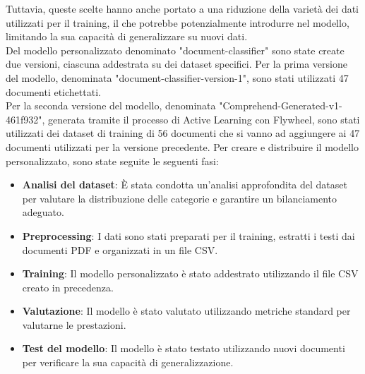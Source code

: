 Tuttavia, queste scelte hanno anche portato a una riduzione della varietà dei dati utilizzati per il training, il che potrebbe potenzialmente introdurre  nel modello, limitando la sua capacità di generalizzare su nuovi dati. \\
Del modello personalizzato denominato "document-classifier" sono state create due versioni, ciascuna addestrata su dei dataset specifici. 
Per la prima versione del modello, denominata "document-classifier-version-1", sono stati utilizzati 47 documenti etichettati.\\
Per la seconda versione del modello, denominata "Comprehend-Generated-v1-
461f932", generata tramite il processo di Active Learning con Flywheel, sono stati utilizzati dei dataset di training di 56 documenti che si vanno ad aggiungere ai 47 documenti utilizzati per la versione precedente.
Per creare e distribuire il modello personalizzato, sono state seguite le seguenti fasi:
\begin{itemize}
    \item \textbf{Analisi del dataset}: È stata condotta un'analisi approfondita del dataset per valutare la distribuzione delle categorie e garantire un bilanciamento adeguato.
    \item \textbf{Preprocessing}: I dati sono stati preparati per il training, estratti i testi dai documenti PDF e organizzati in un file CSV.
    \item \textbf{Training}: Il modello personalizzato è stato addestrato utilizzando il file CSV creato in precedenza.
    \item \textbf{Valutazione}: Il modello è stato valutato utilizzando metriche standard per valutarne le prestazioni.
    \item \textbf{Test del modello}: Il modello è stato testato utilizzando nuovi documenti per verificare la sua capacità di generalizzazione.
\end{itemize}
